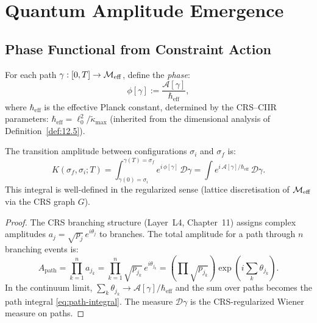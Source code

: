 \section{Quantum Amplitude Emergence}
\label{sec:ch14:quantum}

\subsection{Phase Functional from Constraint Action}

\begin{definition}\label{def:14.9}
For each path $\gamma : [0, T] \to \mathcal{M}_{\mathrm{eff}}$, define the
\emph{phase}:
\begin{equation}\label{eq:phase}
  \phi[\gamma] := \frac{\mathcal{A}[\gamma]}{\hbar_{\mathrm{eff}}},
\end{equation}
where $\hbar_{\mathrm{eff}}$ is the effective Planck constant,
determined by the CRS--CIIR parameters:
$\hbar_{\mathrm{eff}} = \ell_0^2 / \tilde{\kappa}_{\max}$
(inherited from the dimensional analysis of
Definition~\ref{def:12.5}).
\end{definition}

\begin{theorem}\label{thm:14.9}
The transition amplitude between configurations $\sigma_i$ and
$\sigma_f$ is:
\begin{equation}\label{eq:path-integral}
  K(\sigma_f, \sigma_i; T)
  = \int_{\gamma(0) = \sigma_i}^{\gamma(T) = \sigma_f}
  e^{i\,\phi[\gamma]}\,\mathcal{D}\gamma
  = \int e^{i\,\mathcal{A}[\gamma]/\hbar_{\mathrm{eff}}}
  \,\mathcal{D}\gamma.
\end{equation}
This integral is well-defined in the regularized sense (lattice
discretisation of $\mathcal{M}_{\mathrm{eff}}$ via the CRS graph $G$).
\end{theorem}

\begin{proof}
The CRS branching structure (Layer~L4, Chapter~11) assigns complex
amplitudes $a_j = \sqrt{p_j}\,e^{i\theta_j}$ to branches.  The
total amplitude for a path through $n$ branching events is:
\[
  A_{\mathrm{path}} = \prod_{k=1}^n a_{j_k}
  = \prod_{k=1}^n \sqrt{p_{j_k}}\,e^{i\theta_{j_k}}
  = \left(\prod \sqrt{p_{j_k}}\right) \exp\!\left(i\sum_k \theta_{j_k}\right).
\]
In the continuum limit, $\sum_k \theta_{j_k} \to
\mathcal{A}[\gamma]/\hbar_{\mathrm{eff}}$ and the sum over paths
becomes the path integral \eqref{eq:path-integral}.  The measure
$\mathcal{D}\gamma$ is the CRS-regularized Wiener measure on paths.
\end{proof}

